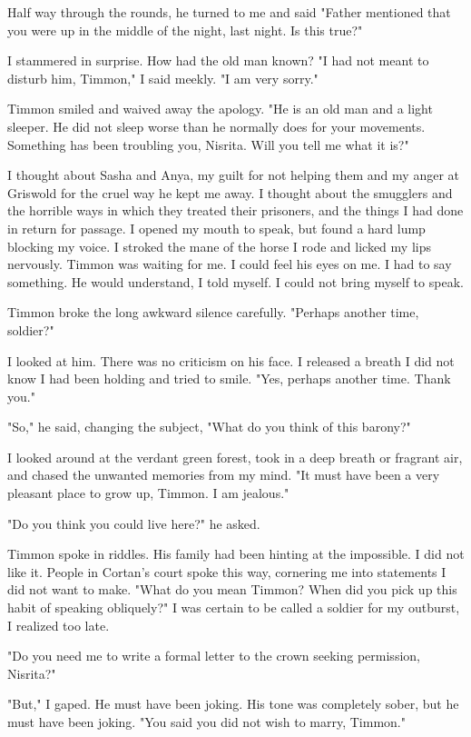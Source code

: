 \documentclass{article}
\begin{document}
Half way through the rounds, he turned to me and said "Father mentioned that you were up in the middle of the night, last night. Is this true?"

I stammered in surprise. How had the old man known? "I had not meant to disturb him, Timmon," I said meekly. "I am very sorry."

Timmon smiled and waived away the apology. "He is an old man and a light sleeper. He did not sleep worse than he normally does for your movements. Something has been troubling you, Nisrita. Will you tell me what it is?"

I thought about Sasha and Anya, my guilt for not helping them and my anger at Griswold for the cruel way he kept me away. I thought about the smugglers and the horrible ways in which they treated their prisoners, and the things I had done in return for passage. I opened my mouth to speak, but found a hard lump blocking my voice. I stroked the mane of the horse I rode and licked my lips nervously. Timmon was waiting for me. I could feel his eyes on me. I had to say something. He would understand, I told myself. I could not bring myself to speak.

Timmon broke the long awkward silence carefully. "Perhaps another time, soldier?" 

I looked at him. There was no criticism on his face. I released a breath I did not know I had been holding and tried to smile. "Yes, perhaps another time. Thank you."

"So," he said, changing the subject, "What do you think of this barony?"

I looked around at the verdant green forest, took in a deep breath or fragrant air,  and chased the unwanted memories from my mind. "It must have been a very pleasant place to grow up, Timmon. I am jealous."

"Do you think you could live here?" he asked.

Timmon spoke in riddles. His family had been hinting at the impossible. I did not like it. People in Cortan's court spoke this way, cornering me into statements I did not want to make. "What do you mean Timmon? When did you pick up this habit of speaking obliquely?" I was certain to be called a soldier for my outburst, I realized too late.

"Do you need me to write a formal letter to the crown seeking permission, Nisrita?"

"But," I gaped. He must have been joking. His tone was completely sober, but he must have been joking. "You said you did not wish to marry, Timmon."
\end{document}
